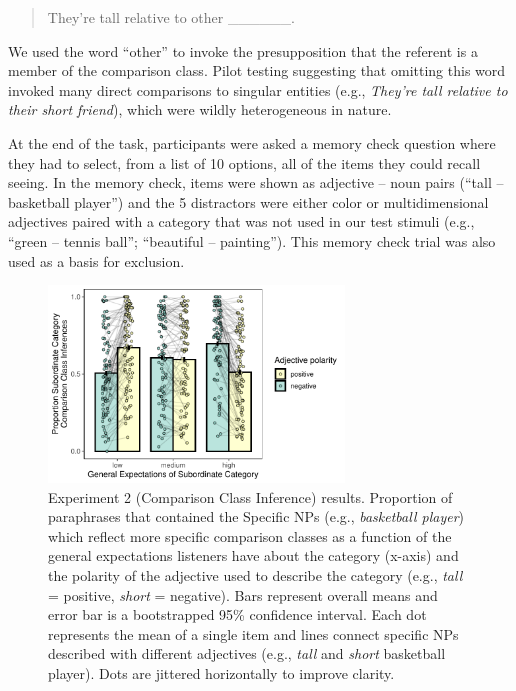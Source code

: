 \documentclass[doc]{apa6}
\begin{document}
\begin{quote}
They're tall relative to other \_\_\_\_\_\_.
\end{quote}

We used the word ``other'' to invoke the presupposition that the referent is a member of the comparison class. Pilot testing suggesting that omitting this word invoked many direct comparisons to singular entities (e.g., \emph{They're tall relative to their short friend}), which were wildly heterogeneous in nature. 

At the end of the task, participants were asked a memory check question where they had to select, from a list of 10 options, all of the items they could recall seeing. In the memory check, items were shown as adjective -- noun pairs (``tall -- basketball player'') and the 5 distractors were either color or multidimensional adjectives paired with a category that was not used in our test stimuli (e.g., ``green -- tennis ball''; ``beautiful -- painting'').
This memory check trial was also used as a basis for exclusion. 


\begin{figure}[t!]
\centering
\includegraphics[width=0.7\textwidth]{figs/bars_cc_finalExpt_prereg_bars_syncDodge.pdf}
\caption{Experiment 2 (Comparison Class Inference) results. Proportion of paraphrases that contained the Specific NPs (e.g., \emph{basketball player}) which reflect more specific comparison classes as a function of the general expectations listeners have about the category (x-axis) and the polarity of the adjective used to describe the category (e.g., \emph{tall} = positive, \emph{short} = negative). Bars represent overall means and error bar is a bootstrapped 95\% confidence interval. Each dot represents the mean of a single item and lines connect specific NPs described with different adjectives (e.g., \emph{tall} and \emph{short} basketball player). Dots are jittered horizontally to improve clarity.}\label{fig:ccInferenceItems}
\end{figure}
\end{document}
